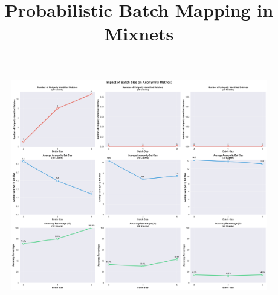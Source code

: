 \documentclass[twocolumn]{article}
\title{Probabilistic Batch Mapping in Mixnets}
\begin{document}




\begin{figure}[!htb]
\centering
\includegraphics[width=\textwidth]{diagrams/batchsize_analysis.png}
\label{fig:batchsize_analysis}
\end{figure}

\end{document}
